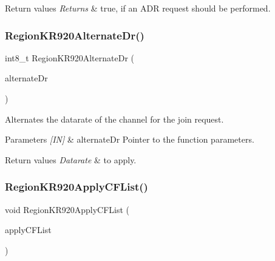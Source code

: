 \begin{DoxyRetVals}{Return values}
{\em Returns} & true, if an A\+DR request should be performed. \\
\hline
\end{DoxyRetVals}
\mbox{\label{group__REGIONKR920_gacebf1e0493259d52fbf28e752bf0ba55}} 
\subsubsection{\texorpdfstring{Region\+K\+R920\+Alternate\+Dr()}{RegionKR920AlternateDr()}}
{\footnotesize\ttfamily int8\+\_\+t Region\+K\+R920\+Alternate\+Dr (\begin{DoxyParamCaption}\item[{\hyperlink{group__REGION_ga001ea4338d1c83f4c785b49d7ad2d696}{Alternate\+Dr\+Params\+\_\+t} $\ast$}]{alternate\+Dr }\end{DoxyParamCaption})}



Alternates the datarate of the channel for the join request. 


\begin{DoxyParams}{Parameters}
{\em \mbox{[}\+I\+N\mbox{]}} & alternate\+Dr Pointer to the function parameters.\\
\hline
\end{DoxyParams}

\begin{DoxyRetVals}{Return values}
{\em Datarate} & to apply. \\
\hline
\end{DoxyRetVals}
\mbox{\label{group__REGIONKR920_ga7b758b39bc0f003f90deaa751a596b02}} 
\subsubsection{\texorpdfstring{Region\+K\+R920\+Apply\+C\+F\+List()}{RegionKR920ApplyCFList()}}
{\footnotesize\ttfamily void Region\+K\+R920\+Apply\+C\+F\+List (\begin{DoxyParamCaption}\item[{\hyperlink{group__REGION_ga71588e9ad07e34b78fa91d51881fd3c6}{Apply\+C\+F\+List\+Params\+\_\+t} $\ast$}]{apply\+C\+F\+List }\end{DoxyParamCaption})}




